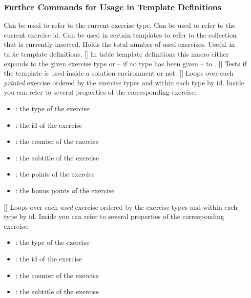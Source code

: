 \documentclass{xsim-manual}
\begin{document}
\subsubsection{Further Commands for Usage in Template Definitions}
\begin{commands}
  \expandable{}
    Can be used to refer to the current exercise type.
  \expandable{}
    Can be used to refer to the current exercise id.
  \expandable{}
    Can be used in certain templates to refer to the collection that is
    currently inserted.
  \expandable{}
    Holds the total number of used exercises.  Useful in table template
    definitions.
  \expandable{}[]
    In table template definitions this macro either expands to the given
    exercise type or -- if no type has been given -- to .
  \expandable{}[]
    Tests if the template is used inside a solution environment or not.
  []
    Loops over each \emph{printed} exercise ordered by the exercise types and
    within each type by id.  Inside  you can refer to several
    properties of the corresponding exercise:
    \begin{itemize}
      \item {}: the type of the exercise
      \item {}: the id of the exercise
      \item {}: the counter of the exercise
      \item {}: the subtitle of the exercise
      \item {}: the points of the exercise
      \item {}: the bonus points of the exercise
    \end{itemize}
  []
    Loops over each \emph{used} exercise ordered by the exercise types and
    within each type by id.  Inside  you can refer to several
    properties of the corresponding exercise:
    \begin{itemize}
      \item {}: the type of the exercise
      \item {}: the id of the exercise
      \item {}: the counter of the exercise
      \item {}: the subtitle of the exercise

\end{itemize}
\end{commands}
\end{document}
